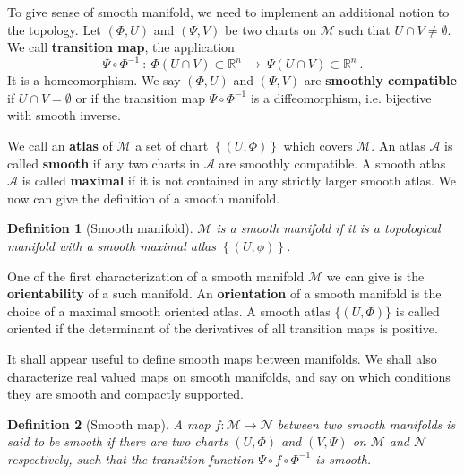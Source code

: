 \documentclass[12pt]{book}
\newcommand{\Acal}{\mathcal{A}}
\newcommand{\Mcal}{\mathcal{M}}
\newcommand{\Ncal}{\mathcal{N}}
\newcommand{\Rbb}{\mathbb{R}}
\theoremstyle{break}
\newtheorem{definition}{Definition}
\begin{document}
To give sense of smooth manifold, we need to implement an additional notion to the topology. Let $(\Phi,U)$ and $(\Psi,V)$ be two charts on $\Mcal$ such that $U \cap V \neq \emptyset$. We call \textbf{transition map}, the application
%
\begin{equation*}
\Psi \circ \Phi^{-1} \ : \ \Phi(U \cap V) \subset \Rbb^n \ \to \ \Psi(U \cap V) \subset \Rbb^n \ .
\end{equation*}
%
It is a homeomorphism. We say $(\Phi,U)$ and $(\Psi,V)$ are \textbf{smoothly compatible} if $U \cap V = \emptyset$ or if the transition map $\Psi \circ \Phi^{-1}$ is a diffeomorphism, i.e. bijective with smooth inverse.




We call an \textbf{atlas} of $\Mcal$ a set of chart $\left\{ (U, \Phi) \right\}$ which covers $\Mcal$. An atlas $\Acal$ is called \textbf{smooth}  if any two charts in $\Acal$ are smoothly compatible. A smooth atlas $\Acal$ is called \textbf{maximal}  if it is not contained in any strictly larger smooth atlas. We now can give the definition of a smooth manifold.


\begin{definition}[Smooth manifold]
$\Mcal$ is a smooth manifold if it is a topological manifold with a smooth maximal atlas $\left\{(U,\phi)\right\}$.
\end{definition}


One of the first characterization of a smooth manifold $\Mcal$ we can give is the \textbf{orientability} of a such manifold. An \textbf{orientation} of a smooth manifold is the choice of a maximal smooth oriented atlas. A smooth atlas $\{(U,\Phi)\}$ is called oriented if the determinant of the derivatives of all transition maps is positive.




It shall appear useful to define smooth maps between manifolds. We shall also characterize real valued maps on smooth manifolds, and say on which conditions they are smooth and compactly supported.


\begin{definition}[Smooth map]
A map $f : \Mcal \to \Ncal$ between two smooth manifolds is said to be smooth if there are two charts $(U,\Phi)$ and $(V,\Psi)$ on $\Mcal$ and $\Ncal$ respectively, such that the transition function $\Psi \circ f \circ \Phi^{-1}$ is  smooth.
\end{definition}
\end{document}
